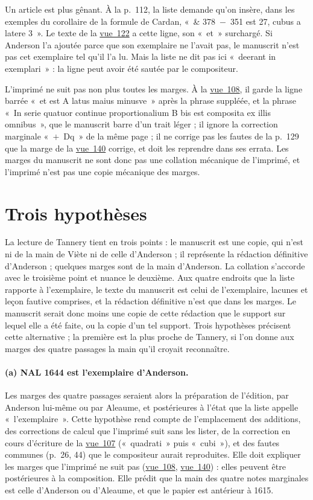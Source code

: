 \documentclass[11pt,a4paper]{article}
\theoremstyle{remark}
\newcommand{\vue}[1]{\href{https://gallica.bnf.fr/ark:/12148/btv1b10033620q/f#1.item}{vue~#1}}
\begin{document}
Un article est plus gênant. À la p.~112, la liste demande qu'on insère, dans
les exemples du corollaire de la formule de Cardan, «~\& 378~$-$~351 est 27,
cubus a latere 3~». Le texte de la \vue{122} a cette ligne, son «~et~»
surchargé. Si Anderson l'a ajoutée parce que son exemplaire ne l'avait pas,
le manuscrit n'est pas cet exemplaire tel qu'il l'a lu. Mais la liste ne dit
pas ici «~deerant in exemplari~» : la ligne peut avoir été sautée par le
compositeur.

L'imprimé ne suit pas non plus toutes les marges. À la \vue{108}, il garde
la ligne barrée «~et est A latus maius minusve~» après la phrase suppléée,
et la phrase «~In serie quatuor continue proportionalium B bis est composita
ex illis omnibus~», que le manuscrit barre d'un trait léger ; il ignore la
correction marginale «~$+$~Dq~» de la même page ; il ne corrige pas les
fautes de la p.~129 que la marge de la \vue{140} corrige, et doit les
reprendre dans ses errata. Les marges du manuscrit ne sont donc pas une
collation mécanique de l'imprimé, et l'imprimé n'est pas une copie
mécanique des marges.

\section{Trois hypothèses}\label{sec:hypotheses}

La lecture de Tannery tient en trois points : le manuscrit est une copie,
qui n'est ni de la main de Viète ni de celle d'Anderson ; il représente la
rédaction définitive d'Anderson ; quelques marges sont de la main
d'Anderson. La collation s'accorde avec le troisième point et nuance le
deuxième. Aux quatre endroits que la liste rapporte à l'exemplaire, le
texte du manuscrit est celui de l'exemplaire, lacunes et leçon fautive
comprises, et la rédaction définitive n'est que dans les marges. Le
manuscrit serait donc moins une copie de cette rédaction que le support
sur lequel elle a été faite, ou la copie d'un tel support. Trois
hypothèses précisent cette alternative ; la première est la plus
proche de Tannery, si l'on donne aux marges des quatre passages la main
qu'il croyait reconnaître.

\paragraph{(a) NAL 1644 est l'exemplaire d'Anderson.}
Les marges des quatre passages seraient alors la préparation de l'édition,
par Anderson lui-même ou par Aleaume, et postérieures à l'état que la liste
appelle «~l'exemplaire~». Cette hypothèse rend compte de l'emplacement des
additions, des corrections de calcul que l'imprimé suit sans les lister, de
la correction en cours d'écriture de la \vue{107} («~quadrati~» puis
«~cubi~»), et des fautes communes (p.~26, 44) que le compositeur aurait
reproduites. Elle doit expliquer les marges que l'imprimé ne suit pas
(\vue{108}, \vue{140}) : elles peuvent être postérieures à la composition.
Elle prédit que la main des quatre notes marginales est celle d'Anderson ou
d'Aleaume, et que le papier est antérieur à 1615.
\end{document}
